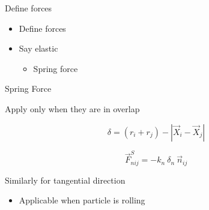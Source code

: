 \documentclass[pdf]
{beamer}
\begin{document}
\begin{frame}{Define forces}

\begin{itemize}
\item Define forces
\item Say elastic
  \begin{itemize}
  \item Spring force
  \end{itemize}
\end{itemize}

\end{frame}




\begin{frame}{Spring Force}

  Apply only when they are in overlap

\begin{equation}
  \label{eq:overlap}
  \delta = (r_i + r_j) - |\vec{X}_{i} - \vec{X}_{j}|
\end{equation}


\begin{equation}
  \label{eq:normal_spring_force}
  \vec{F}_{nij}^S = -k_n \> \delta_n \> \vec{n}_{ij}
\end{equation}

Similarly for tangential direction

\begin{itemize}
\item Applicable when particle is rolling
\end{itemize}
\end{frame}
\end{document}

